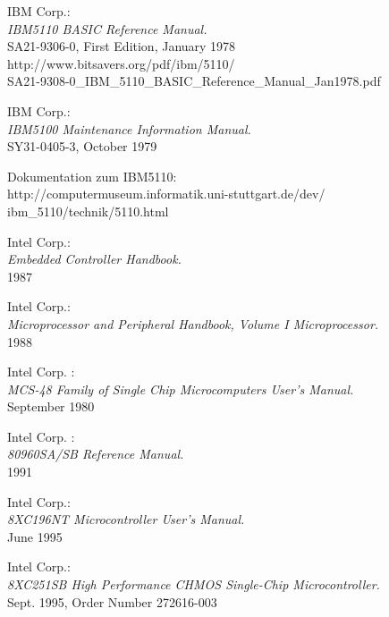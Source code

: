 IBM Corp.: \\
                 {\em IBM5110 BASIC Reference Manual.\/} \\
                 SA21-9306-0, First Edition, January 1978 \\
                 http://www.bitsavers.org/pdf/ibm/5110/ \\
                 SA21-9308-0\_IBM\_5110\_BASIC\_Reference\_Manual\_Jan1978.pdf

 IBM Corp.: \\
                 {\em IBM5100 Maintenance Information Manual.\/} \\
                 SY31-0405-3, October 1979

 Dokumentation zum IBM5110: \\
          http://computermuseum.informatik.uni-stuttgart.de/dev/ \\
          ibm\_5110/technik/5110.html

 Intel Corp.: \\
                 {\em Embedded Controller Handbook.\/} \\
		 1987

 Intel Corp.: \\
                 {\em Microprocessor and Peripheral Handbook, Volume I
                 Microprocessor.\/} \\
                 1988

  Intel Corp. : \\
                 {\em MCS-48 Family of Single Chip Microcomputers User's Manual.\/} \\
                 September 1980

 Intel Corp. : \\
                 {\em 80960SA/SB Reference Manual.\/} \\
                 1991

 Intel Corp.: \\
                 {\em 8XC196NT Microcontroller User's Manual.\/} \\
                 June 1995

 Intel Corp.: \\
                 {\em 8XC251SB High Performance CHMOS Single-Chip
                  Microcontroller.\/} \\
                 Sept. 1995, Order Number 272616-003

